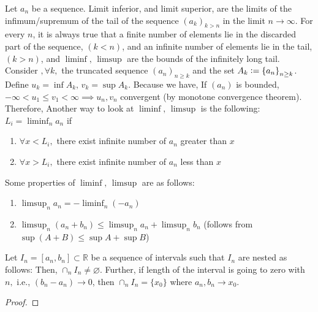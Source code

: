 \begin{definition}
Let $a_n$ be a sequence.
Limit inferior, and limit superior, are the limits of the infimum/supremum of the tail of the sequence $(a_k)_{k>n}$ in the limit $n\to\infty$. For every $n$, it is always true that a finite number of elements lie in the discarded part of the sequence, $(k<n)$, and an infinite number of elements lie in the tail, $(k>n)$, and $\liminf,\,\limsup$ are the bounds of the infinitely long tail. Consider $,\forall k,$ the truncated sequence $(a_n)_{n\geq k}$ and the set $A_k\mathrel{\mathop:}=\left\{a_n\right\}_{n\geq k}$. Define $u_k=\inf A_k,\,v_k=\sup A_k$. Because
we have,
If $(a_n)$ is bounded, $-\infty<u_1\leq v_1<\infty\implies u_n,v_n$ convergent (by monotone convergence theorem). Therefore,
Another way to look at $\liminf,\,\limsup$ is the following: $L_i=\liminf_n a_n$ if
\begin{enumerate}
    \item $\forall x<L_i,$ there exist infinite number of $a_n$ greater than $x$
    \item $\forall x>L_i,$ there exist infinite number of $a_n$ less than $x$
\end{enumerate}
\end{definition}

Some properties of $\liminf,\,\limsup$ are as follows:
\begin{enumerate}
    \item $\limsup_n a_n = -\liminf_n(-a_n)$
    \item $\limsup_n (a_n+b_n) \leq \limsup_n a_n + \limsup_n b_n$ (follows from $\sup(A + B)\leq \sup A + \sup B$)
\end{enumerate}

\begin{lemma}
    Let $I_n=\left[a_n,b_n\right]\subset \mathbb{R}$ be a sequence of intervals such that $I_n$ are nested as follows:
    Then, $\cap_n I_n \neq \varnothing$. Further, if length of the interval is going to zero with $n,$ i.e., $(b_n-a_n)\to 0$, then $\cap_n I_n = \{x_0\}$ where $a_n,b_n\to x_0$.
\end{lemma}
\begin{proof}
    \todo{}
\end{proof}

